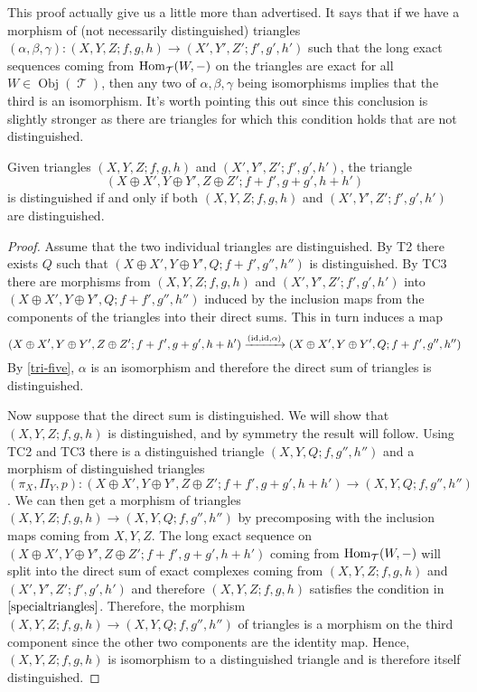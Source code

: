 \documentclass[11pt]{article}
\DeclareMathOperator{\ob}{Obj}
\DeclareMathOperator{\TT}{\mathcal{T}}
\begin{document}
\begin{rmk}\label{specialtriangles}
This proof actually give us a little more than advertised. It says that if we have a morphism of (not necessarily distinguished) triangles $(\alpha,\beta,\gamma): (X,Y,Z; f,g,h) \to (X',Y',Z'; f',g',h')$ such that the long exact sequences coming from $\Hom_{\TT}(W,-)$ on the triangles are exact for all $W \in \ob(\TT)$, then any two of $\alpha,\beta,\gamma$ being isomorphisms implies that the third is an isomorphism. It's worth pointing this out since this conclusion is slightly stronger as there are triangles for which this condition holds that are not distinguished.
\end{rmk}

\begin{cor}\label{sumoftriangles}
	Given triangles $(X,Y,Z; f,g,h)$ and $(X',Y',Z'; f',g',h')$, the triangle
	\[
		(X \oplus X', Y \oplus Y', Z \oplus Z'; f+f', g+g', h+h')
	\]
	is distinguished if and only if both $(X,Y,Z; f,g,h)$ and $(X',Y',Z'; f',g',h')$ are distinguished.
\end{cor}
\begin{proof}
Assume that the two individual triangles are distinguished. By T2 there exists $Q$ such that $(X \oplus X', Y \oplus Y', Q; f+f', g'', h'')$ is distinguished. By TC3 there are morphisms from $(X,Y,Z; f,g,h)$ and $(X',Y',Z'; f',g',h')$ into $(X \oplus X', Y \oplus Y', Q; f+f', g'', h'')$ induced by the inclusion maps from the components of the triangles into their direct sums. This in turn induces a map 
\[
	(X \oplus X', Y \oplus Y', Z \oplus Z'; f+f', g+g', h+h') \xrightarrow{(\operatorname{id},\operatorname{id},\alpha)}(X \oplus X', Y \oplus Y', Q; f+f', g'', h'')
\]
By \autoref{tri-five}, $\alpha$ is an isomorphism and therefore the direct sum of triangles is distinguished.

Now suppose that the direct sum is distinguished. We will show that $(X,Y,Z; f,g,h)$ is distinguished, and by symmetry the result will follow. Using TC2 and TC3 there is a distinguished triangle $(X,Y,Q; f,g'',h'')$ and a morphism of distinguished triangles $(\pi_X,\Pi_Y, p): (X \oplus X', Y \oplus Y', Z \oplus Z'; f+f', g+g', h+h') \to (X,Y,Q; f,g'',h'')$. We can then get a morphism of triangles $(X,Y,Z; f,g,h) \to (X,Y,Q; f,g'',h'')$ by precomposing with the inclusion maps coming from $X,Y,Z$. The long exact sequence on $(X \oplus X', Y \oplus Y', Z \oplus Z'; f+f', g+g', h+h')$ coming from $\Hom_{\TT}(W,-)$ will split into the direct sum of exact complexes coming from $(X,Y,Z; f,g,h)$ and $(X',Y',Z'; f',g',h')$ and therefore $(X,Y,Z; f,g,h)$ satisfies the condition in $\autoref{specialtriangles}$. Therefore, the morphism $(X,Y,Z; f,g,h) \to (X,Y,Q; f,g'',h'')$ of triangles is a morphism on the third component since the other two components are the identity map. Hence, $(X,Y,Z; f,g,h)$ is isomorphism to a distinguished triangle and is therefore itself distinguished.
\end{proof}
\end{document}
